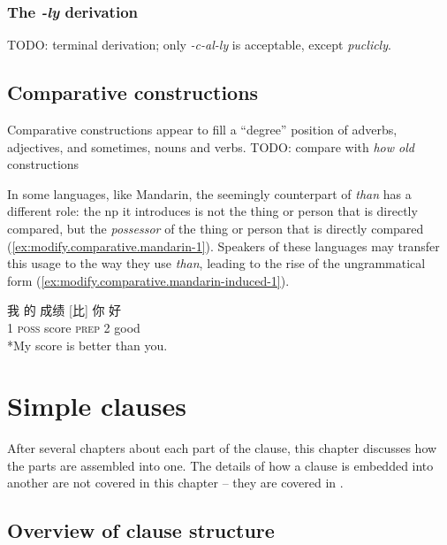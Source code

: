 \documentclass[UTF8, a4paper, oneside, scheme=plain, 12pt]{ctexbook}
\newcommand{\form}[1]{\emph{#1}}
\newcommand{\category}[1]{\textsc{#1}}
\begin{document}
\subsection{The \form{-ly} derivation}

TODO: terminal derivation; only \form{-c-al-ly} is acceptable,
except \form{puclicly}.

\section{Comparative constructions}

Comparative constructions appear to fill a ``degree'' position
of adverbs, adjectives, and sometimes, nouns and verbs.
TODO: compare with \form{how old} constructions  

In some languages, like Mandarin, 
the seemingly counterpart of \form{than} 
has a different role: 
the \acs{np} it introduces is not the thing or person that is directly compared, 
but the \emph{possessor} of the thing or person that is directly compared
(\ref{ex:modify.comparative.mandarin-1}).
Speakers of these languages may transfer this usage 
to the way they use \form{than},
leading to the rise of the ungrammatical form (\ref{ex:modify.comparative.mandarin-induced-1}).

\begin{exe}
    \ex\label{ex:modify.comparative.mandarin-1} \gll 我 的 成绩 [比] 你 好 \\
    1 \category{poss} score \category{prep} 2 good \\
    \ex\label{ex:modify.comparative.mandarin-induced-1} *My score is better than you.
\end{exe}

\chapter{Simple clauses}\label{chap:simple-clause}

After several chapters about each part of the clause,
this chapter discusses how the parts are assembled into one.
The details of how a clause is embedded into another are not covered in this chapter
-- they are covered in .

\section{Overview of clause structure}\label{sec:clause-template}
\end{document}
